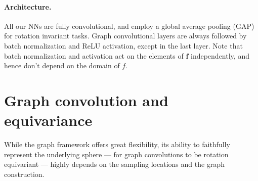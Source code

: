 \documentclass{article} %
\renewcommand{\b}[1]{{\bm{#1}}}  %
\newcommand{\nati}[1]{{\color[rgb]{.3,.5,.9}{#1}}}
\begin{document}
\paragraph{Architecture.}
All our NNs are fully convolutional, and employ a global average pooling (GAP) for rotation invariant tasks.
Graph convolutional layers are always followed by batch normalization and ReLU activation, except in the last layer.
Note that batch normalization and activation act on the elements of $\b{f}$ independently, and hence don't depend on the domain of $f$.


\section{Graph convolution and equivariance} \label{sec:equivariance}

While the graph framework offers great flexibility, its ability to faithfully represent the underlying sphere --- for graph convolutions to be rotation equivariant --- highly depends on the sampling locations and the graph construction.
\end{document}
